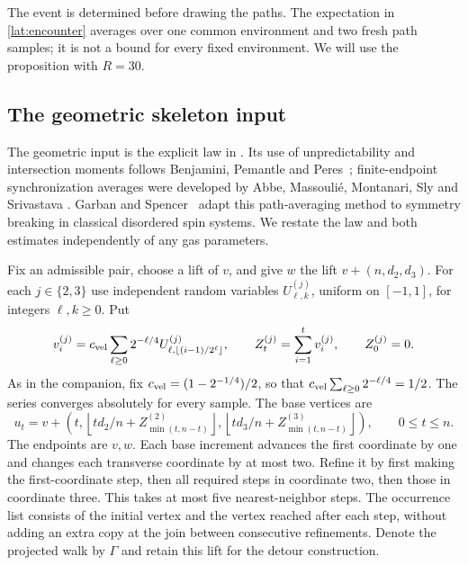 The event is determined before drawing the paths.  The expectation in
\eqref{lat:encounter} averages over one common environment and two fresh
path samples; it is not a bound for every fixed environment.  We will
use the proposition with $R=30$.

\subsection{The geometric skeleton input}\label{lat:skeleton-law}

The geometric input is the explicit law in
\cite[Section~8.1, pp.~22--24; Lemma~8.1 and
Equations~(24)--(25), p.~23]{SoftCompanion}.
Its use of unpredictability and intersection moments follows Benjamini,
Pemantle and Peres~\cite[Theorem~1.3 and Lemma~3.1]{BPP1998}; finite-endpoint
synchronization averages were developed by
Abbe, Massouli\'e, Montanari, Sly and Srivastava
\cite[Section~6, Lemma~6.1]{AbbeMassoulieMontanariSlySrivastava2018}.
Garban and Spencer~\cite[Theorem~2.4 and Lemma~2.5]{GarbanSpencer2023}
adapt this path-averaging method to symmetry breaking in classical
disordered spin systems.
We restate the law and both estimates independently of any gas parameters.

Fix an admissible pair, choose a lift of $v$, and give $w$ the lift
$v+(n,d_2,d_3)$. For each $j\in\{2,3\}$ use independent random variables
$U^{(j)}_{\ell,k}$, uniform on $[-1,1]$, for integers $\ell,k\ge0$. Put
\begin{equation}\label{lat:velocity-law}
 v_i^{(j)}=c_{\rm vel}\sum_{\ell\ge0}2^{-\ell/4}
             U^{(j)}_{\ell,\lfloor(i-1)/2^\ell\rfloor},
 \qquad Z_t^{(j)}=\sum_{i=1}^t v_i^{(j)},\qquad Z_0^{(j)}=0.
\end{equation}
As in the companion, fix
$c_{\rm vel}=(1-2^{-1/4})/2$, so that
$c_{\rm vel}\sum_{\ell\ge0}2^{-\ell/4}=1/2$. The series converges
absolutely for every sample. The base vertices are
\begin{equation}\label{lat:nominal}
 u_t=v+\left(t,
   \left\lfloor td_2/n+Z_{\min(t,n-t)}^{(2)}\right\rfloor,
   \left\lfloor td_3/n+Z_{\min(t,n-t)}^{(3)}\right\rfloor\right),
 \qquad 0\le t\le n.
\end{equation}
The endpoints are $v,w$. Each base increment advances the first coordinate
by one and changes each transverse coordinate by at most two. Refine it
by first making the first-coordinate step, then all required steps in
coordinate two, then those in coordinate three. This takes at most five
nearest-neighbor steps. The occurrence list consists of the initial vertex
and the vertex reached after each step, without adding an extra copy at
the join between consecutive refinements. Denote the projected walk by
$\Gamma$ and retain this lift for the detour construction.

